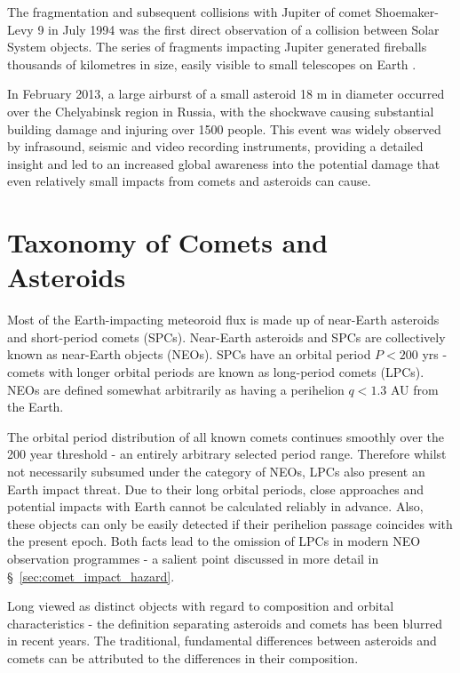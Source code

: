 The fragmentation and subsequent collisions with Jupiter of comet Shoemaker-Levy 9 in July 1994 was the first direct observation of a collision between Solar System objects. The series of fragments impacting Jupiter generated fireballs thousands of kilometres in size, easily visible to small telescopes on Earth \citep{2004jpsm.book..159H}. 

In February 2013, a large airburst of a small asteroid 18 m in diameter \citep{2013Natur.503..238B} occurred over the Chelyabinsk region in Russia, with the shockwave causing substantial building damage and injuring over 1500 people. This event was widely observed by infrasound, seismic and video recording instruments, providing a detailed insight and led to an increased global awareness into the potential damage that even relatively small impacts from comets and asteroids can cause.   

\section{Taxonomy of Comets and Asteroids}

Most of the Earth-impacting meteoroid flux is made up of near-Earth asteroids and short-period comets (SPCs). Near-Earth asteroids and SPCs are collectively known as near-Earth objects (NEOs). SPCs have an orbital period $P < 200$ yrs - comets with longer orbital periods are known as long-period comets (LPCs). NEOs are defined somewhat arbitrarily as having a perihelion $q < 1.3$ AU from the Earth.

The orbital period distribution of all known comets continues smoothly over the 200 year threshold - an entirely arbitrary selected period range. Therefore whilst not necessarily subsumed under the category of NEOs, LPCs also present an Earth impact  threat. Due to their long orbital periods, close approaches and potential impacts with Earth cannot be calculated reliably in advance. Also, these objects can only be easily detected if their perihelion passage coincides with the present epoch. Both facts lead to the omission of LPCs in modern NEO observation programmes - a salient point discussed in more detail in \S~\ref{sec:comet_impact_hazard}.

Long viewed as distinct objects with regard to composition and orbital characteristics - the definition separating asteroids and comets has been blurred in recent years. The traditional, fundamental differences between asteroids and comets can be attributed to the differences in their composition.

